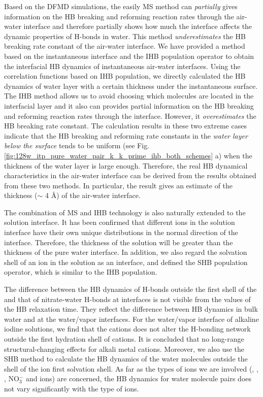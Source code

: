 Based on the DFMD simulations, the easily MS method %
can \emph{partially} gives information on the HB breaking and reforming reaction
rates through the air-water interface and therefore partially shows how much the interface affects the dynamic properties of H-bonds in water. 
This method \emph{underestimates} the HB breaking rate constant of the air-water interface. 
We have provided a method based on the instantaneous interface and the
IHB population operator to obtain the interfacial HB dynamics of instantaneous air-water interfaces.  
Using the correlation functions based on IHB population, we directly calculated the HB dynamics of water layer with a certain thickness 
under the instantaneous surface. 
The IHB method allows us to avoid choosing which molecules are located in the interfacial layer and
it also can provides partial information on the HB breaking and reforming reaction rates through the interface. 
However, it \emph{overestimates} the HB breaking rate constant. The calculation results in these two extreme cases
indicate that the HB breaking and reforming rate constants in the \emph{water layer below the surface} tends to be uniform 
(see Fig.\ref{fig:128w_itp_pure_water_pair_k_k_prime_ihb_both_schemes} a) 
when the thickness of the water layer is large enough. Therefore, the real HB dynamical characteristics in the air-water interface 
can be derived from the results obtained from these two methods. 
In particular, the result gives an estimate of the thickness ($\sim$ 4 \AA) of the air-water interface.

The combination of MS and IHB technology is also naturally extended to the solution interface. 
It has been confirmed that different ions in the solution interface have their own unique distributions in the normal direction of the interface. 
Therefore, the thickness of the solution will be greater than the thickness of the pure water interface. 
In addition, we also regard the solvation shell of an ion in the solution as an interface, 
and defined the SHB population operator, which is similar to the IHB population.

The difference between the HB dynamics of H-bonds outside the first shell of the \Li and that of nitrate-water H-bonds 
at interfaces is not visible from the values of the HB relaxation time. They reflect the difference between HB dynamics in 
bulk water and at the water/vapor interfaces. For the water/vapor interface of alkaline iodine solutions, we find 
that the cations does not alter the H-bonding network outside the first hydration shell of cations. 
It is concluded that no long-range structural-changing effects for alkali metal cations.
Moreover, we also use the SHB method to calculate the HB dynamics of the water molecules outside the shell of the ion first solvation shell.
As far as the types of ions we are involved (\Li, \Na, \K, NO$^-_3$ and \I ions) are concerned, 
the HB dynamics for water molecule pairs does not vary significantly with the type of ions.


